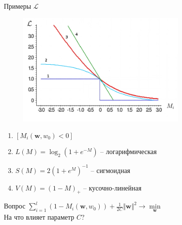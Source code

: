 \documentclass[12pt]{beamer}
\begin{document}
\begin{frame}{Примеры $\mathcal{L}$}
	\begin{figure}[htbp]
	  \includegraphics[height=160pt, keepaspectratio = true]{images/l}
	\end{figure}
	\begin{enumerate}
		\item $\left[M_i(\mathbf{w}, w_0) < 0 \right]$
		\item $L(M) = \log_2(1+e^{-M})$ -- логарифмическая
		\item $S(M) = 2(1+e^M)^{-1}$ -- сигмоидная
		\item $V(M) = (1-M)_+$ -- кусочно-линейная
	\end{enumerate}
\end{frame}

\begin{frame}{Вопрос}
	$ \sum\limits_{i=1}^l (1 - M_i(\mathbf{w}, w_0)) + \frac{1}{2C}\Vert \mathbf{w} \Vert^2 \rightarrow \min\limits_{\mathbf{w}}$\\
	\bigbreak
	На что влияет параметр $C$?
\end{frame}
\end{document}
